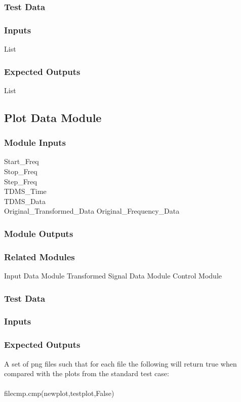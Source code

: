 \documentclass[12pt]{article}
\begin{document}
\subsubsection{Test Data}

\subsubsection{Inputs}
List
\subsubsection{Expected Outputs}
List

\subsection{Plot Data Module}

\subsubsection{Module Inputs}
Start\_Freq\\
Stop\_Freq\\
Step\_Freq\\
TDMS\_Time\\
TDMS\_Data\\
Original\_Transformed\_Data
Original\_Frequency\_Data
\subsubsection{Module Outputs}

\subsubsection{Related Modules}
Input Data Module
Transformed Signal Data Module
Control Module
\subsubsection{Test Data}

\subsubsection{Inputs}

\subsubsection{Expected Outputs}
A set of png files such that for each file the following will return true
when compared with the plots from the standard test case:\\\\
filecmp.cmp(newplot,testplot,False)
\end{document}
